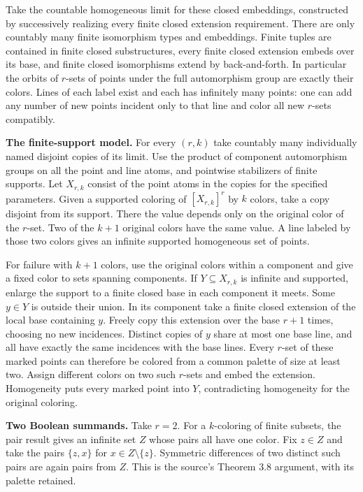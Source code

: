 \documentclass[11pt]{article}
\begin{document}
Take the countable homogeneous limit for these closed embeddings, constructed by successively realizing every finite closed extension requirement. There are only countably many finite isomorphism types and embeddings. Finite tuples are contained in finite closed substructures, every finite closed extension embeds over its base, and finite closed isomorphisms extend by back-and-forth. In particular the orbits of \(r\)-sets of points under the full automorphism group are exactly their colors. Lines of each label exist and each has infinitely many points: one can add any number of new points incident only to that line and color all new \(r\)-sets compatibly.

\textbf{The finite-support model.} For every \((r,k)\) take countably many individually named disjoint copies of its limit. Use the product of component automorphism groups on all the point and line atoms, and pointwise stabilizers of finite supports. Let \(X_{r,k}\) consist of the point atoms in the copies for the specified parameters. Given a supported coloring of \([X_{r,k}]^r\) by \(k\) colors, take a copy disjoint from its support. There the value depends only on the original color of the \(r\)-set. Two of the \(k+1\) original colors have the same value. A line labeled by those two colors gives an infinite supported homogeneous set of points.

For failure with \(k+1\) colors, use the original colors within a component and give a fixed color to sets spanning components. If \(Y\subseteq X_{r,k}\) is infinite and supported, enlarge the support to a finite closed base in each component it meets. Some \(y\in Y\) is outside their union. In its component take a finite closed extension of the local base containing \(y\). Freely copy this extension over the base \(r+1\) times, choosing no new incidences. Distinct copies of \(y\) share at most one base line, and all have exactly the same incidences with the base lines. Every \(r\)-set of these marked points can therefore be colored from a common palette of size at least two. Assign different colors on two such \(r\)-sets and embed the extension. Homogeneity puts every marked point into \(Y\), contradicting homogeneity for the original coloring.

\textbf{Two Boolean summands.} Take \(r=2\). For a \(k\)-coloring of finite subsets, the pair result gives an infinite set \(Z\) whose pairs all have one color. Fix \(z\in Z\) and take the pairs \(\{z,x\}\) for \(x\in Z\setminus\{z\}\). Symmetric differences of two distinct such pairs are again pairs from \(Z\). This is the source's Theorem 3.8 argument, with its palette retained.
\end{document}
